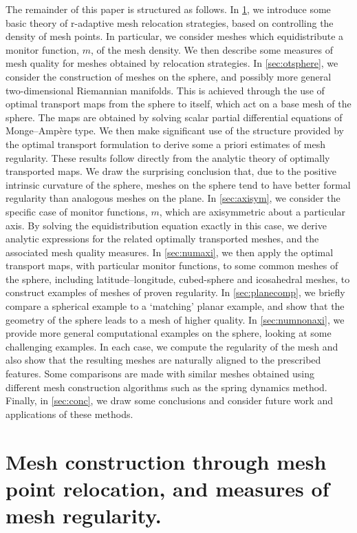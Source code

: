 \documentclass[11pt, a4paper]{scrartcl}  %
\theoremstyle{plain}
\theoremstyle{definition}
\numberwithin{equation}{section}
\begin{document}
The remainder of this paper is structured as follows. In
\cref{sec:prelim}, we introduce some basic theory of r-adaptive mesh
relocation strategies, based on controlling the density of mesh points.
In particular, we consider meshes which equidistribute a monitor
function, $m$, of the mesh density. We then describe some measures of
mesh quality for meshes obtained by relocation strategies. In
\cref{sec:otsphere}, we consider the construction of meshes on the
sphere, and possibly more general two-dimensional Riemannian manifolds.
This is achieved through the use of optimal transport maps from the
sphere to itself, which act on a base mesh of the sphere. The maps are
obtained by solving scalar partial differential equations of
Monge--Ampère type. We then make significant use of the structure
provided by the optimal transport formulation to derive some a priori
estimates of mesh regularity. These results follow directly from the
analytic theory of optimally transported maps. We draw the surprising
conclusion that, due to the positive intrinsic curvature of the sphere,
meshes on the sphere tend to have better formal regularity than
analogous meshes on the plane. In \cref{sec:axisym}, we consider the
specific case of monitor functions, $m$, which are axisymmetric about a
particular axis. By solving the equidistribution equation exactly in
this case, we derive analytic expressions for the related optimally
transported meshes, and the associated mesh quality measures. In
\cref{sec:numaxi}, we then apply the optimal transport maps, with
particular monitor functions, to some common meshes of the sphere,
including latitude--longitude, cubed-sphere and icosahedral meshes,
to construct examples of meshes of proven regularity. In
\cref{sec:planecomp}, we briefly compare a spherical example to a
`matching' planar example, and show that the geometry of the sphere
leads to a mesh of higher quality. In \cref{sec:numnonaxi}, we provide
more general computational examples on the sphere, looking at some
challenging examples. In each case, we compute the regularity of the
mesh and also show that the resulting meshes are naturally aligned to
the prescribed features. Some comparisons are made with similar meshes
obtained using different mesh construction algorithms such as the spring
dynamics method. Finally, in \cref{sec:conc}, we draw some conclusions
and consider future work and applications of these methods.

\section{Mesh construction through mesh point relocation, and measures of mesh regularity.}
\label{sec:prelim}
\end{document}
